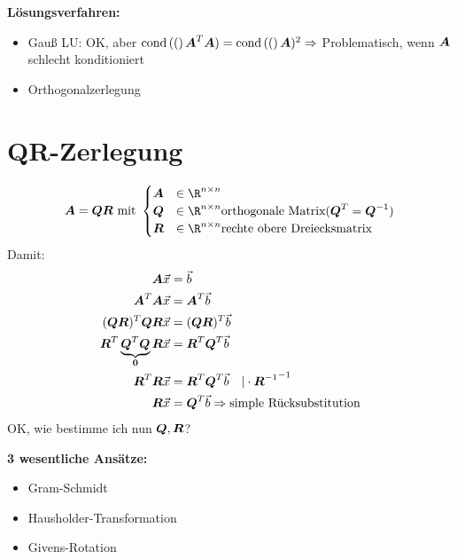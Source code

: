 \textbf{Lösungsverfahren:}
\begin{itemize}
\item Gauß LU: OK, aber $\text{cond}\left((\right)\boldsymbol {A}^T\boldsymbol {A}) = \text{cond}\left((\right)\boldsymbol {A})^2\Rightarrow$ Problematisch, wenn $\boldsymbol {A}$ schlecht konditioniert
\item Orthogonalzerlegung
\end{itemize}

\section{QR-Zerlegung}
\[\ma A = \ma Q\ma R \text{ mit }\begin{cases}
\ma A & \in \R^{n\times n}\\
\ma Q & \in \R^{n\times n} \text{orthogonale Matrix} (\ma Q^T = \ma Q^{-1})\\
\ma R & \in \R^{n\times n} \text{rechte obere Dreiecksmatrix}
\end{cases}\]
Damit:
\begin{equation}
\begin{split}
\boldsymbol {A}\vec x &= \vec b\\
\boldsymbol {A}^T\boldsymbol {A}\vec x &= \boldsymbol {A}^T\vec b\\
(\boldsymbol {Q}\boldsymbol {R})^T\boldsymbol {Q}\boldsymbol {R}\vec x &= (\boldsymbol {Q}\boldsymbol {R})^T\vec b\\
\boldsymbol {R}^T\underbrace{\boldsymbol {Q}^T\boldsymbol {Q}}_{\boldsymbol {0}}\boldsymbol {R}\vec x &= \boldsymbol {R}^T\boldsymbol {Q}^T\vec b\\
\boldsymbol {R}^T\boldsymbol {R}\vec x &= \boldsymbol {R}^T\boldsymbol {Q}^T\vec b\quad\vert\cdot{\ensuremath{\boldsymbol {R}}^{-1}}^{-1}\\
\boldsymbol {R}\vec x &= \boldsymbol {Q}^T\vec b\Rightarrow \text{simple Rücksubstitution}
\end{split}
\end{equation}
OK, wie bestimme ich nun $\boldsymbol {Q},\boldsymbol {R}$?

\textbf{3 wesentliche Ansätze:}
\begin{itemize}
\item Gram-Schmidt
\item Hausholder-Transformation
\item Givens-Rotation
\end{itemize}

